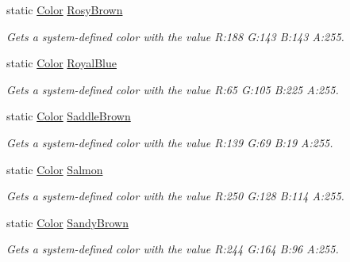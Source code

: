 \begin{DoxyCompactItemize}
static \hyperlink{struct_microsoft_1_1_xna_1_1_framework_1_1_color}{Color} \hyperlink{struct_microsoft_1_1_xna_1_1_framework_1_1_color_a1aac28efe1f79dba64a37e1aeed6e32f}{Rosy\+Brown}
\begin{DoxyCompactList}\small\item\em Gets a system-\/defined color with the value R\+:188 G\+:143 B\+:143 A\+:255.\end{DoxyCompactList}\item 
static \hyperlink{struct_microsoft_1_1_xna_1_1_framework_1_1_color}{Color} \hyperlink{struct_microsoft_1_1_xna_1_1_framework_1_1_color_ac35586f060f331db722f885bc7606a82}{Royal\+Blue}
\begin{DoxyCompactList}\small\item\em Gets a system-\/defined color with the value R\+:65 G\+:105 B\+:225 A\+:255.\end{DoxyCompactList}\item 
static \hyperlink{struct_microsoft_1_1_xna_1_1_framework_1_1_color}{Color} \hyperlink{struct_microsoft_1_1_xna_1_1_framework_1_1_color_a37f246dfbf6c2f9e07692594b07b16a3}{Saddle\+Brown}
\begin{DoxyCompactList}\small\item\em Gets a system-\/defined color with the value R\+:139 G\+:69 B\+:19 A\+:255.\end{DoxyCompactList}\item 
static \hyperlink{struct_microsoft_1_1_xna_1_1_framework_1_1_color}{Color} \hyperlink{struct_microsoft_1_1_xna_1_1_framework_1_1_color_a9fc8566f5de44fea4a4d98b8ac7729d6}{Salmon}
\begin{DoxyCompactList}\small\item\em Gets a system-\/defined color with the value R\+:250 G\+:128 B\+:114 A\+:255.\end{DoxyCompactList}\item 
static \hyperlink{struct_microsoft_1_1_xna_1_1_framework_1_1_color}{Color} \hyperlink{struct_microsoft_1_1_xna_1_1_framework_1_1_color_ac01e6d4915ef4d4fc9cff415497b7734}{Sandy\+Brown}
\begin{DoxyCompactList}\small\item\em Gets a system-\/defined color with the value R\+:244 G\+:164 B\+:96 A\+:255.\end{DoxyCompactList}\item 

\end{DoxyCompactItemize}
